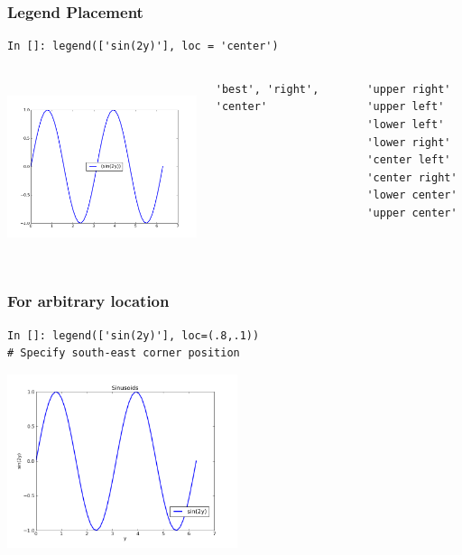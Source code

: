 \documentclass[14pt,compress]{beamer}
\newcounter{time}
\newcommand{\inctime}[1]{\addtocounter{time}{#1}{\tiny \thetime\ m}}
\begin{document}
\begin{frame}[fragile]
\frametitle{Legend Placement}
\begin{block}{}
    \small
\begin{lstlisting}
In []: legend(['sin(2y)'], loc = 'center')
\end{lstlisting}
\end{block}

\begin{columns}
 \includegraphics[height=2in, interpolate=true]{data/position}  
\begin{lstlisting}
'best', 'right', 'center'
\end{lstlisting}
\vspace{-0.2in}
\begin{lstlisting}
'upper right'     
'upper left'      
'lower left'      
'lower right'     
'center left'     
'center right'    
'lower center'    
'upper center'    
\end{lstlisting}
\end{columns}
\end{frame}

\begin{frame}[fragile]
  \frametitle{For arbitrary location}
\vspace*{-0.1in}
\begin{lstlisting}
In []: legend(['sin(2y)'], loc=(.8,.1)) 
# Specify south-east corner position
\end{lstlisting}
\begin{center}
  \includegraphics[height=2in, interpolate=true]{data/loc}  
\end{center}
\end{frame}
\end{document}
